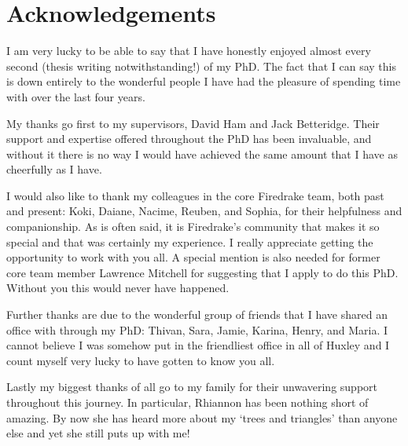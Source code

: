 \chapter*{Acknowledgements}

I am very lucky to be able to say that I have honestly enjoyed almost every second (thesis writing notwithstanding!) of my PhD.
The fact that I can say this is down entirely to the wonderful people I have had the pleasure of spending time with over the last four years.

My thanks go first to my supervisors, David Ham and Jack Betteridge.
Their support and expertise offered throughout the PhD has been invaluable, and without it there is no way I would have achieved the same amount that I have as cheerfully as I have.

I would also like to thank my colleagues in the core Firedrake team, both past and present: Koki, Daiane, Nacime, Reuben, and Sophia, for their helpfulness and companionship.
As is often said, it is Firedrake's community that makes it so special and that was certainly my experience.
I really appreciate getting the opportunity to work with you all.
A special mention is also needed for former core team member Lawrence Mitchell for suggesting that I apply to do this PhD.
Without you this would never have happened.

Further thanks are due to the wonderful group of friends that I have shared an office with through my PhD: Thivan, Sara, Jamie, Karina, Henry, and Maria.
I cannot believe I was somehow put in the friendliest office in all of Huxley and I count myself very lucky to have gotten to know you all.

Lastly my biggest thanks of all go to my family for their unwavering support throughout this journey.
In particular, Rhiannon has been nothing short of amazing.
By now she has heard more about my `trees and triangles' than anyone else and yet she still puts up with me!

\clearpage
